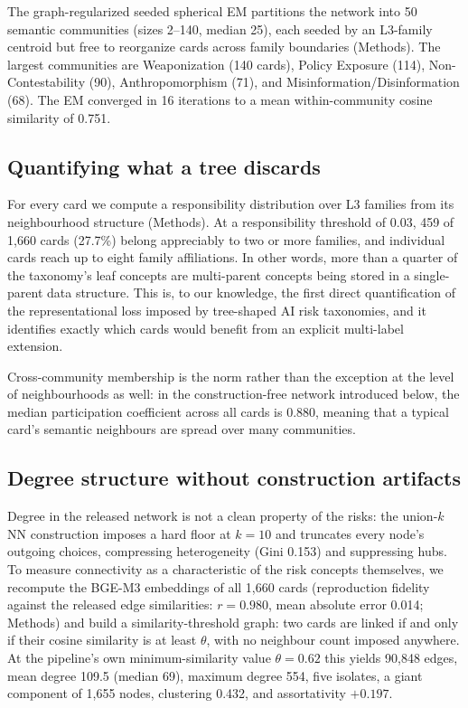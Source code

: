 \documentclass[fleqn,10pt]{wlscirep}
\begin{document}
The graph-regularized seeded spherical EM partitions the network into 50
semantic communities (sizes 2--140, median 25), each seeded by an L3-family
centroid but free to reorganize cards across family boundaries
(Methods). The largest communities are Weaponization (140 cards), Policy
Exposure (114), Non-Contestability (90), Anthropomorphism (71), and
Misinformation/Disinformation (68). The EM converged in 16 iterations to a
mean within-community cosine similarity of 0.751.

\subsection*{Quantifying what a tree discards}

For every card we compute a responsibility distribution over L3 families from
its neighbourhood structure (Methods). At a responsibility threshold of
0.03, 459 of 1,660 cards (27.7\%) belong appreciably to two or more
families, and individual cards reach up to eight family affiliations. In
other words, more than a quarter of the taxonomy's leaf concepts are
multi-parent concepts being stored in a single-parent data structure. This is,
to our knowledge, the first direct quantification of the representational
loss imposed by tree-shaped AI risk taxonomies, and it identifies exactly
which cards would benefit from an explicit multi-label extension.

Cross-community membership is the norm rather than the exception at the
level of neighbourhoods as well: in the construction-free network
introduced below, the median participation coefficient\cite{guimera2005}
across all cards is 0.880, meaning that a typical card's semantic
neighbours are spread over many communities.

\subsection*{Degree structure without construction artifacts}

Degree in the released network is not a clean property of the risks: the
union-$k$NN construction imposes a hard floor at $k=10$ and truncates every
node's outgoing choices, compressing heterogeneity (Gini 0.153) and
suppressing hubs. To measure connectivity as a characteristic of the risk
concepts themselves, we recompute the BGE-M3 embeddings of all 1,660 cards
(reproduction fidelity against the released edge similarities: $r=0.980$,
mean absolute error 0.014; Methods) and build a similarity-threshold graph:
two cards are linked if and only if their cosine similarity is at least
$\theta$, with no neighbour count imposed anywhere. At the pipeline's own
minimum-similarity value $\theta=0.62$ this yields 90,848 edges, mean degree
109.5 (median 69), maximum degree 554, five isolates, a giant component of
1,655 nodes, clustering 0.432, and assortativity $+0.197$.
\end{document}
